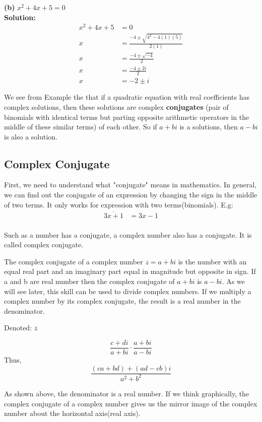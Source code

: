\textbf{(b)} $x^2+4x+5=0$ \\
\textbf{Solution:} \\
\begin{align*}
    x^2+4x+5 & =0                                    \\
    x        & =\frac{-4\pm\sqrt{4^2-4(1)(5)}}{2(1)} \\
    x        & =\frac{-4\pm\sqrt{-4}}{2}             \\
    x        & =\frac{-4\pm2i}{2}                    \\
    x        & =-2\pm i
\end{align*}

We see from Example the that if a quadratic equation with real coefficients has complex solutions, then these solutions are complex \textbf{conjugates} (pair of binomials with identical terms but parting opposite arithmetic operators in the middle of these similar terms) of each other. 
So if $a+bi$ is a solutions, then $a-bi$ is also a solution.

\subsection{Complex Conjugate}
First, we need to understand what "conjugate" means in mathematics. 
In general, we can find out the conjugate of an expression by changing the sign in the middle of two terms. 
It only works for expression with two terms(binomials).
E.g: 
\begin{align*}
    \overline{3x+1} & =3x-1 \\
\end{align*}

Such as a number has a conjugate, a complex number also has a conjugate.
It is called complex conjugate.

The complex conjugate of a complex number $z=a+bi$ is the number with an equal real part and an imaginary part equal in magnitude but opposite in sign.
If a and b are real number then the complex conjugate of $a+bi$ is $a-bi$. As we will see later, this skill can be used to divide complex numbers.
If we multiply a complex number by its complex conjugate, the result is a real number in the denominator. 

Denoted: $\overline{z}$



$$\frac{c + di}{a+bi}\cdot \frac{a+bi}{a-bi}$$
Thus, 
$$\frac{(ca + bd) + (ad -cb)i }{a^2 + b^2}$$

As shown above, the denominator is a real number.
If we think graphically, the complex conjugate of a complex number gives us the mirror image of the complex number
about the horizontal axis(real axis).

